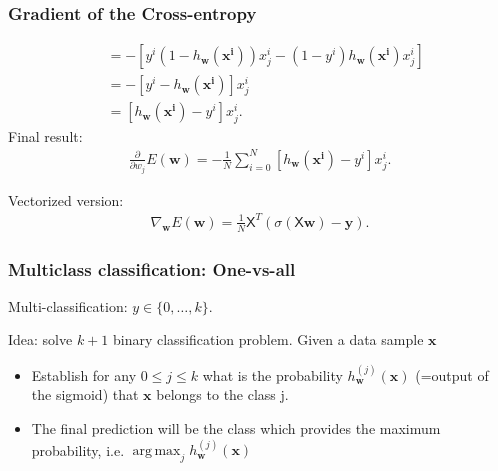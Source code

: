 \documentclass{beamer}
\DeclareMathOperator*{\argmax}{arg\,max}
\begin{document}
	\begin{frame}
		\frametitle{Gradient of the Cross-entropy}
		\begin{align*}
			&= -[y^i(1 - h_{\bm{w}}(\bm{x^i}))x^i_j - (1-y^i)h_{\bm{w}}(\bm{x^i})x^i_j]\\
			&= -[y^i -  h_{\bm{w}}(\bm{x^i})]x^i_j\\
			& = [h_{\bm{w}}(\bm{x^i})- y^i]x^i_j.
		\end{align*}
	Final result:
		\begin{align*}
			\frac{\partial}{\partial w_j} E(\bm{w}) = -\frac{1}{N} \sum_{i=0}^{N} [h_{\bm{w}}(\bm{x^i})- y^i]x^i_j.
		\end{align*}
	
	Vectorized version:
	\begin{align*}
		\nabla_{\bm{w}}E(\bm{w}) = \frac{1}{N} \mathsf{X}^T(\sigma(\mathsf{X}\bm{w}) - \bm{y}).
	\end{align*}
	
	\end{frame}

	\begin{frame}
		\frametitle{Multiclass classification: One-vs-all}
		
		Multi-classification: $y \in \{0, \dots, k\}$.
		
		\vspace{5mm}
		
		Idea: solve $k+1$ binary classification problem. Given a data sample $\bm{x}$
		\begin{itemize}
			\item Establish for any $0\leq j \leq k$ what is the probability $h^{(j)}_{\bm{w}}(\bm{x})$ (=output of the sigmoid) that $\bm{x}$ belongs to the class j.
			\item The final prediction will be the class which provides the maximum probability, i.e. $\argmax_j h^{(j)}_{\bm{w}}(\bm{x})$ 
		\end{itemize}
		
		
	\end{frame}
\end{document}
